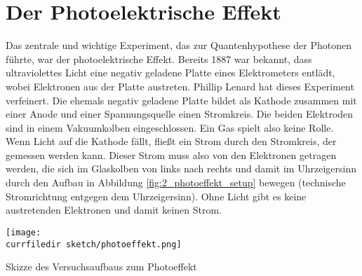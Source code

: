 


\section{Der Photoelektrische Effekt}

Das zentrale und wichtige Experiment, das zur Quantenhypothese der Photonen führte, war der photoelektrische Effekt. Bereits 1887 war bekannt, dass ultraviolettes Licht eine negativ geladene Platte eines Elektrometers entlädt, wobei Elektronen aus der Platte austreten. Phillip Lenard hat dieses Experiment verfeinert. Die ehemals negativ geladene Platte bildet als Kathode zusammen mit einer Anode und einer Spannungsquelle einen Stromkreis. Die beiden Elektroden sind in einem Vakuumkolben eingeschlossen. Ein Gas spielt also keine Rolle. Wenn Licht auf die Kathode fällt, fließt ein Strom durch den Stromkreis, der gemessen werden kann. Dieser Strom muss also von den Elektronen getragen werden, die sich im Glaskolben von links nach rechts und damit im Uhrzeigersinn durch den Aufbau in Abbildung  \ref{fig:2_photoeffekt_setup} bewegen
(technische Stromrichtung entgegen dem Uhrzeigersinn). Ohne Licht gibt es keine austretenden Elektronen und damit keinen Strom.

\begin{marginfigure}
    \texttt{[image: \\currfiledir sketch/photoeffekt.png]}
    \caption{Skizze des Versuchsaufbaus zum Photoeffekt}
    \label{fig:2_photoeffekt_setup}
\end{marginfigure}



